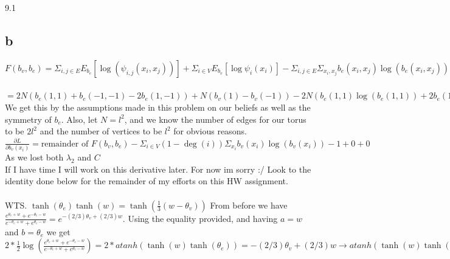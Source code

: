 \documentclass[12pt]{article}
\begin{document}
\begin{section}{9.1}
	\subsection{b}
	$F(b_v,b_e)=\Sigma_{i,j\in E}E_{b_e}[\log(\psi_{i,j}(x_i,x_j))]+\Sigma_{i\in V}E_{b_v}[\log\psi_i(x_i)]-\Sigma_{i,j\in E}\Sigma_{x_i,x_j}b_e(x_i,x_j)\log(b_e(x_i,x_j))-\Sigma_{i\in V}(1-\deg(i))\Sigma_{x_i}b_{v}(x_i)\log(b_v(x_i)) $
	\\
	\\$= 2N(b_e(1,1)+b_e(-1,-1)-2b_e(1,-1))+N(b_v(1)-b_v(-1))-2N(b_e(1,1)\log(b_e(1,1))+2b_e(1,-1)\log(b_e(1,-1))+b_e(-1,-1)\log(b_e(-1,-1)))-N*3(b_{v}(1)\log(b_v(1))+b_{v}(-1)\log(b_v(-1)))$ We get this by the assumptions made in this problem on our beliefs as well as the symmetry of $b_e$. Also, let $N=l^2$, and we know the number of edges for our torus to be $2l^2$ and the number of vertices to be $l^2$ for obvious reasons.
	\\
	$\frac{\partial L}{\partial b_v(x_i)}=\text{remainder of }F(b_v,b_e)-\Sigma_{i\in V}(1-\deg(i))\Sigma_{x_i}b_{v}(x_i)\log(b_v(x_i))-1+0+0$ As we lost both $\lambda_2$ and $C$ \\
	If I have time I will work on this derivative later. For now im sorry :/ Look to the identity done below for the remainder of my efforts on this HW assignment.
	\\
	\\
	WTS. $\tanh(\theta_e)\tanh(w)=\tanh(\frac{1}{3}(w-\theta_v))$ From before we have $\frac{e^{\theta_e+w}+e^{-\theta_e-w}}{e^{-\theta_e+w}+e^{\theta_e-w}} = e^{-(2/3)\theta_v + (2/3)w}$. Using the equality provided, and having $a = w$ and $b=\theta_e$ we get $2*\frac{1}{2}\log(\frac{e^{\theta_e+w}+e^{-\theta_e-w}}{e^{-\theta_e+w}+e^{\theta_e-w}}) = 2*atanh(\tanh(w)\tanh(\theta_e)) = -(2/3)\theta_v + (2/3)w \rightarrow atanh(\tanh(w)\tanh(\theta_e)) = (1/3)(w-\theta_v) \rightarrow \tanh(w)\tanh(\theta_e) = \tanh((1/3)(w-\theta_v) ) \square$
\end{section}
\end{document}
